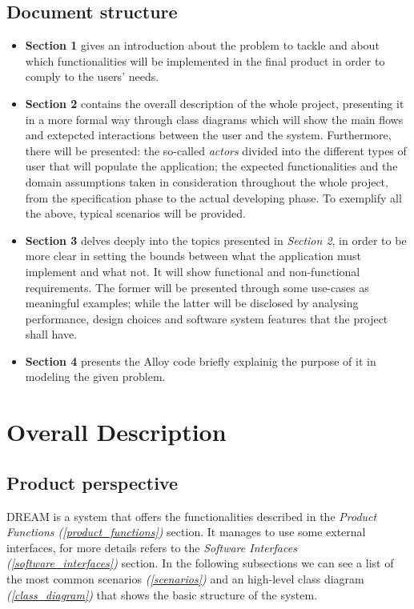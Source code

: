 \documentclass[table, 12pt]{article}
\begin{document}
\subsection{Document structure}
\begin{itemize}
    \item \textbf{Section 1} gives an introduction about the problem to tackle and about which functionalities will be implemented in the final product in order to comply to the users' needs.
    \item \textbf{Section 2} contains the overall description of the whole project, presenting it in a more formal way through class diagrams which will show the main flows and extepcted interactions between the user and the system. Furthermore, there will be presented: the so-called \emph{actors} divided into the different types of user that will populate the application; the expected functionalities and the domain assumptions taken in consideration throughout the whole project, from the specification phase to the actual developing phase. To exemplify all the above, typical scenarios will be provided.
    \item \textbf{Section 3} delves deeply into the topics presented in \emph{Section 2}, in order to be more clear in setting the bounds between what the application must implement and what not. It will show functional and non-functional requirements. The former will be presented through some use-cases as meaningful examples; while the latter will be disclosed by analysing performance, design choices and software system features that the project shall have.
    \item \textbf{Section 4} presents the Alloy code briefly explainig the purpose of it in modeling the given problem.
\end{itemize}
\newpage
\section{Overall Description}
\subsection{Product perspective}
DREAM is a system that offers the functionalities described in the \textit{Product Functions (\ref{product_functions})} section.
It manages to use some external interfaces, for more details refers to the \textit{Software Interfaces (\ref{software_interfaces})} section.
In the following subsections we can see a list of the most common scenarios \textit{(\ref{scenarios})} and an high-level class diagram \textit{(\ref{class_diagram})} that shows the basic structure of the system.
\end{document}
